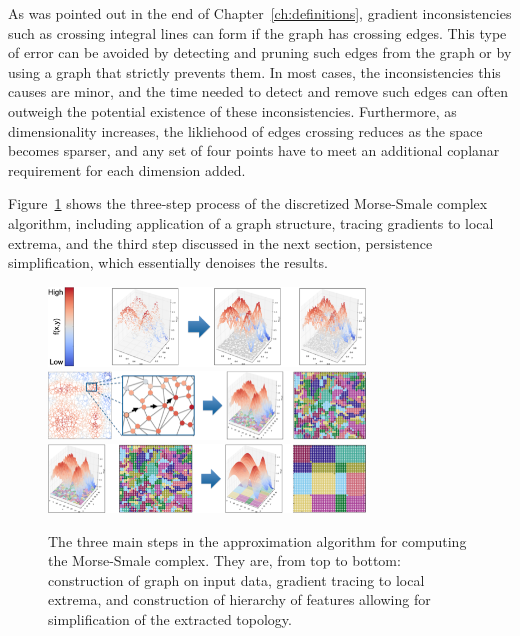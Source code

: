 As was pointed out in the end of Chapter~\ref{ch:definitions}, gradient inconsistencies such as crossing integral lines can form if the graph has crossing edges.
%
This type of error can be avoided by detecting and pruning such edges from the graph or by using a graph that strictly prevents them.
%
In most cases, the inconsistencies this causes are minor, and the time needed to detect and remove such edges can often outweigh the potential existence of these inconsistencies.
%
Furthermore, as dimensionality increases, the likliehood of edges crossing reduces as the space becomes sparser, and any set of four points have to meet an additional coplanar requirement for each dimension added.
%

Figure~\ref{fig:mscAlgorithm} shows the three-step process of the discretized Morse-Smale complex algorithm, including application of a graph structure, tracing gradients to local extrema, and the third step discussed in the next section, persistence simplification, which essentially denoises the results.

\begin{figure}[b]
  \centering
  \includegraphics[width=0.75\textwidth]{figs/chap4/amscStep1}
  \includegraphics[width=0.75\textwidth]{figs/chap4/amscStep2}
  \includegraphics[width=0.75\textwidth]{figs/chap4/amscStep3}
  \caption[Illustration of the Morse-Smale approximation algorithm for unstructured data]{The three main steps in the approximation algorithm for computing the Morse-Smale complex. They are, from top to bottom: construction of graph on input data, gradient tracing to local extrema, and construction of hierarchy of features allowing for simplification of the extracted topology.}
  \label{fig:mscAlgorithm}
\end{figure}

